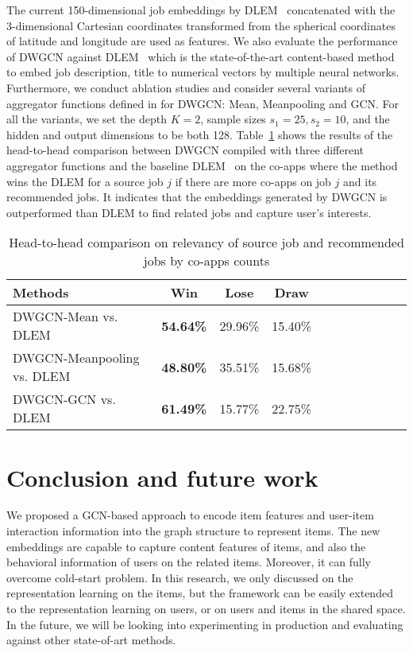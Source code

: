 \documentclass[manuscript,screen,review]{acmart}
\begin{document}
The current 150-dimensional job embeddings by DLEM~\cite{zhao:2021embedding} concatenated with the 3-dimensional Cartesian coordinates transformed from the spherical coordinates of latitude and longitude are used as features. We also evaluate the performance of DWGCN against DLEM~\cite{zhao:2021embedding}  which is the  state-of-the-art content-based method to embed job description, title to numerical vectors by multiple neural networks. Furthermore, we conduct ablation studies and consider several variants of aggregator functions defined in \cite{hamilton2017inductive} for DWGCN: Mean, Meanpooling and GCN. For all the variants, we set the depth $K=2$, sample sizes $s_1=25,s_2=10$, and the hidden and output dimensions to be both 128.
Table~\ref{tab:comp} shows the results of the head-to-head comparison between DWGCN compiled with three different aggregator functions and the baseline DLEM~\cite{zhao:2021embedding} on the co-apps where the method wins the DLEM for a source job $j$ if there are more co-apps on job $j$ and its recommended jobs. It indicates that the embeddings generated by DWGCN is outperformed than DLEM to find related jobs and capture user's interests.  

\begin{table}
  \caption{Head-to-head comparison on relevancy of source job and recommended jobs by co-apps counts}
  \label{tab:comp}
  \begin{tabular}{lcccccccccc}
    \toprule
    Methods & Win & Lose & Draw \\
    \midrule
    DWGCN-Mean vs. DLEM& \textbf{54.64\%} & 29.96\% & 15.40\%\\
    DWGCN-Meanpooling vs. DLEM& \textbf{48.80\%} & 35.51\% & 15.68\%\\
    DWGCN-GCN vs. DLEM & \textbf{61.49\%} & 15.77\% & 22.75\%\\
  \bottomrule
\end{tabular}
\end{table}
 

\section{Conclusion and future work}
We proposed a GCN-based approach to encode item features and user-item interaction information into the graph structure to represent items. The new embeddings are capable to capture content features of items, and also the behavioral information of users on the related items. Moreover, it can fully overcome cold-start problem. In this research, we only discussed on the representation learning on the items, but the framework can be easily extended to the representation learning on users, or on users and items in the shared space. In the future, we will be looking into experimenting in production and evaluating against other state-of-art methods.
\end{document}
